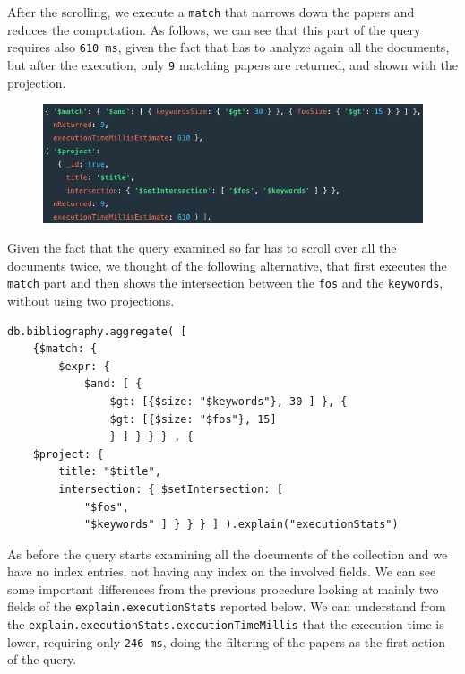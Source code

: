 \begin{enumerate}
\begin{figure}[H]
\begin{center}
            \label{fig:performance_query3mongodb1}%
        \end{center}
    \end{figure}
    After the scrolling, we execute a \verb|match| that narrows down the papers and reduces the computation.
    As follows, we can see that this part of the query requires also \verb|610 ms|, given the fact that has to analyze again all the documents, but after the execution, only \verb|9| matching papers are returned, and shown with the projection.
    \begin{figure}[H]
        \begin{center}
            \includegraphics[width=0.9\linewidth]{ImagesMongoDB/performance_query3mongodb2}
            \label{fig:performance_query3mongodb2}%
        \end{center}
    \end{figure}
    Given the fact that the query examined so far has to scroll over all the documents twice, we thought of the following alternative, that first executes the \verb|match| part and then shows the intersection between the \verb|fos| and the \verb|keywords|, without using two projections.
    \begin{lstlisting}[label={lst:performance_query3mongodb3}]
db.bibliography.aggregate( [
    {$match: {
        $expr: {
            $and: [ {
                $gt: [{$size: "$keywords"}, 30 ] }, {
                $gt: [{$size: "$fos"}, 15]
                } ] } } } , {
    $project: {
        title: "$title",
        intersection: { $setIntersection: [
            "$fos",
            "$keywords" ] } } } ] ).explain("executionStats")
    \end{lstlisting}
    As before the query starts examining all the documents of the collection and we have no index entries, not having any index on the involved fields.
    We can see some important differences from the previous procedure looking at mainly two fields of the \verb|explain.executionStats| reported below.
    We can understand from the \verb|explain.executionStats.executionTimeMillis| that the execution time is lower, requiring only \verb|246 ms|, doing the filtering of the papers as the first action of the query.

\end{enumerate}
